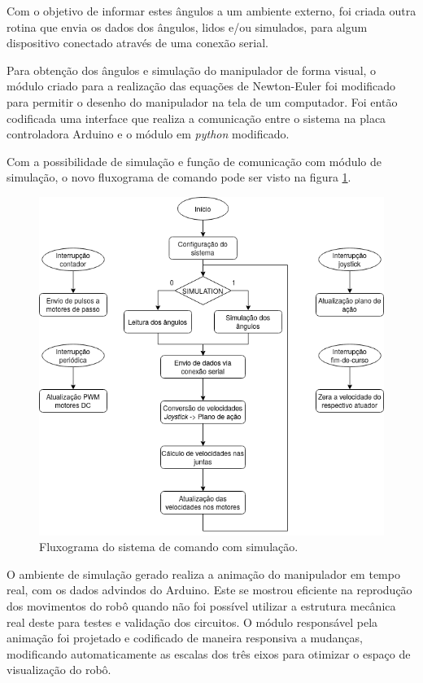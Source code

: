 Com o objetivo de informar estes ângulos a um ambiente externo, foi criada outra rotina que envia os dados 
dos ângulos, lidos e/ou simulados, para algum dispositivo conectado através de uma conexão serial.

Para obtenção dos ângulos e simulação do manipulador de forma visual, o módulo criado para a 
realização das equações de Newton-Euler foi modificado para permitir o desenho do manipulador
na tela de um computador. Foi então codificada uma interface que realiza a comunicação entre o 
sistema na placa controladora Arduino e o módulo em \textit{python} modificado.

Com a possibilidade de simulação e função de comunicação com módulo de simulação, o 
novo fluxograma de comando pode ser visto na figura \ref{fig:fluxograma2}. 

\begin{figure}[h]
    \caption{Fluxograma do sistema de comando com simulação.}

    \begin{centering}
        \includegraphics[width=0.8\columnwidth]{images/controle/fluxo2.png} 
    \par\end{centering}

    \label{fig:fluxograma2}
\end{figure}

O ambiente de simulação gerado realiza a animação do manipulador em tempo real, com os dados advindos
do Arduino. Este se mostrou eficiente na reprodução dos movimentos do robô quando não
foi possível utilizar a estrutura mecânica real deste para testes e validação dos circuitos. 
O módulo responsável pela animação foi projetado e codificado de maneira responsiva a mudanças, 
modificando automaticamente as escalas dos três eixos para otimizar o espaço de visualização do robô.

